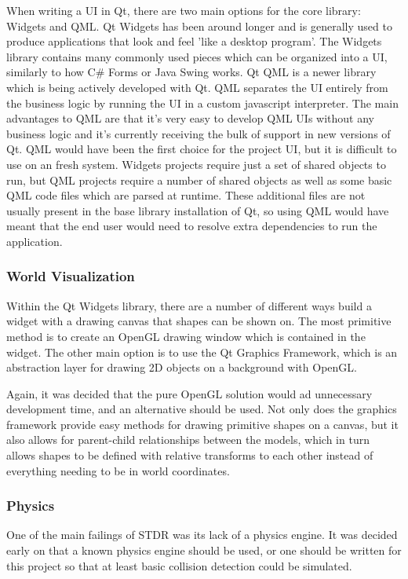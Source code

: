  	When writing a UI in Qt, there are two main options for the core library: Widgets and QML. Qt Widgets has been around longer and is generally used to produce applications that look and feel 'like a desktop program'. The Widgets library contains many commonly used pieces which can be organized into a UI, similarly to how C\# Forms or Java Swing works. Qt QML is a newer library which is being actively developed with Qt. QML separates the UI entirely from the business logic by running the UI in a custom javascript interpreter. The main advantages to QML are that it's very easy to develop QML UIs without any business logic and it's currently receiving the bulk of support in new versions of Qt. QML would have been the first choice for the project UI, but it is difficult to use on an fresh system. Widgets projects require just a set of shared objects to run, but QML projects require a number of shared objects as well as some basic QML code files which are parsed at runtime. These additional files are not usually present in the base library installation of Qt, so using QML would have meant that the end user would need to resolve extra dependencies to run the application.
 	
 	\subsubsection{World Visualization}
 	Within the Qt Widgets library, there are a number of different ways build a widget with a drawing canvas that shapes can be shown on. The most primitive method is to create an OpenGL drawing window which is contained in the widget. The other main option is to use the Qt Graphics Framework, which is an abstraction layer for drawing 2D objects on a background with OpenGL.
 	
 	Again, it was decided that the pure OpenGL solution would ad unnecessary development time, and an alternative should be used. Not only does the graphics framework provide easy methods for drawing primitive shapes on a canvas, but it also allows for parent-child relationships between the models, which in turn allows shapes to be defined with relative transforms to each other instead of everything needing to be in world coordinates.
 	
 	\subsubsection{Physics}
 	One of the main failings of STDR was its lack of a physics engine. It was decided early on that a known physics engine should be used, or one should be written for this project so that at least basic collision detection could be simulated.
 	
